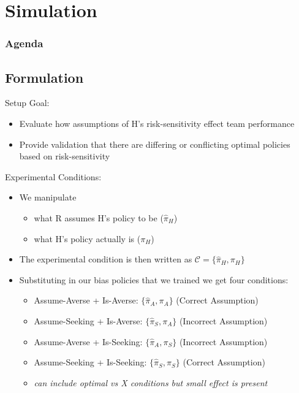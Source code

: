 \documentclass[aspectratio=1610, xcolor=dvipsnames]{packages/beamer}
\newcommand{\displayTOC}{\begin{frame}\frametitle{Agenda} \tableofcontents[currentsection, subsectionstyle=show/show/hide]\end{frame}}
\begin{document}
\section{Simulation}\label{sec:simulation} \displayTOC
\subsection{Formulation}
\begin{frame}{Setup}
    Goal: \begin{itemize}
        \item Evaluate how assumptions of H's risk-sensitivity effect team performance
        \item Provide validation that there are differing or conflicting optimal policies based on risk-sensitivity
    \end{itemize}
    Experimental Conditions: \begin{itemize}
        \item We manipulate
        \begin{itemize}
            \item what R assumes H's policy to be ($\hat{\pi}_{H}$)
            \item what H's policy actually is ($\pi_{H}$)
        \end{itemize}
        \item The experimental condition is then written as $\mathcal{C} = \{\hat{\pi}_{H},\pi_{H}\}$
        \item Substituting in our bias policies that we trained we get four conditions:
        \begin{itemize}
            \item Assume-Averse + Is-Averse:  $\{\hat{\pi}_{A},\pi_{A}\}$ (Correct Assumption)
            \item Assume-Seeking + Is-Averse:  $\{\hat{\pi}_{S},\pi_{A}\}$ (Incorrect Assumption)
            \item Assume-Averse + Is-Seeking:  $\{\hat{\pi}_{A},\pi_{S}\}$ (Incorrect Assumption)
            \item Assume-Seeking + Is-Seeking:  $\{\hat{\pi}_{S},\pi_{S}\}$ (Correct Assumption)
            \item \textit{can include optimal vs X conditions but small effect is present}
        \end{itemize}

    \end{itemize}
\end{frame}
\end{document}
